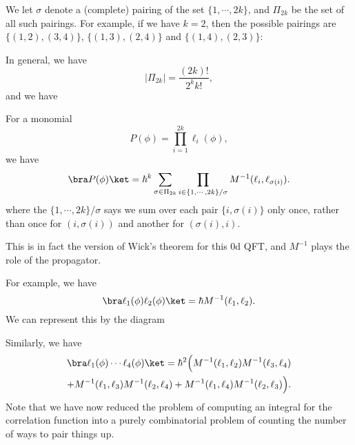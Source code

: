 \documentclass[a4paper]{article}
\begin{document}
We let $\sigma$ denote a (complete) pairing of the set $\{1, \cdots, 2k\}$, and $\Pi_{2k}$ be the set of all such pairings. For example, if we have $k = 2$, then the possible pairings are $\{(1, 2), (3, 4)\}$, $\{(1, 3), (2, 4)\}$ and $\{(1, 4), (2, 3)\}$:
\begin{center}
\end{center}
In general, we have
\[
  |\Pi_{2k}| = \frac{(2k)!}{2^k k!},
\]
and we have
\begin{thm}
  For a monomial
  \[
    P(\phi) = \prod_{i = 1}^{2k} \ell_i(\phi),
  \]
  we have
  \[
    \bra P(\phi)\ket = \hbar^{k}\sum_{\sigma \in \Pi_{2k}} \prod_{i \in \{1, \cdots, 2k\}/\sigma} M^{-1}(\ell_i, \ell_{\sigma(i)}).
  \]
  where the $\{1, \cdots, 2k\}/\sigma$ says we sum over each pair $\{i, \sigma(i)\}$ only once, rather than once for $(i, \sigma(i))$ and another for $(\sigma(i), i)$.
\end{thm}
This is in fact the version of Wick's theorem for this 0d QFT, and $M^{-1}$ plays the role of the propagator.

For example, we have
\[
  \bra \ell_1(\phi) \ell_2(\phi)\ket = \hbar M^{-1} (\ell_1, \ell_2).
\]
We can represent this by the diagram
\begin{center}
\end{center}
Similarly, we have
\begin{multline*}
  \bra \ell_1(\phi) \cdots \ell_4(\phi)\ket = \hbar^2 \Big(M^{-1}(\ell_1, \ell_2) M^{-1}(\ell_3, \ell_4) \\
  + M^{-1}(\ell_1, \ell_3) M^{-1}(\ell_2, \ell_4) + M^{-1}(\ell_1, \ell_4) M^{-1}(\ell_2, \ell_3)\Big).
\end{multline*}
Note that we have now reduced the problem of computing an integral for the correlation function into a purely combinatorial problem of counting the number of ways to pair things up.
\end{document}
